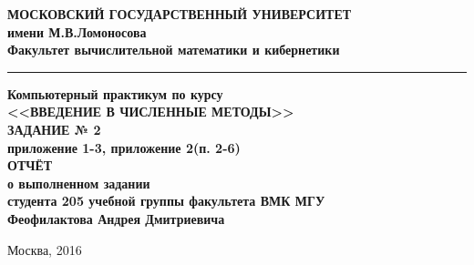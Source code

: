 \begin{titlepage}
\begin{center}

\textbf{\small 
    МОСКОВСКИЙ ГОСУДАРСТВЕННЫЙ УНИВЕРСИТЕТ \\ 
    \bigskip имени М.В.Ломоносова \\ 
    \bigskip Факультет вычислительной математики и кибернетики
}
\hrule

\vfill{}

\textbf{
    Компьютерный практикум по курсу \\ \bigskip
    <<ВВЕДЕНИЕ В ЧИСЛЕННЫЕ МЕТОДЫ>> \\ \bigskip
    ЗАДАНИЕ № 2 \\ \bigskip
    приложение 1-3, приложение 2(п. 2-6) \\ \bigskip
    ОТЧЁТ \\ \bigskip
    о выполненном задании \\ \bigskip
    студента 205 учебной группы факультета ВМК МГУ \\ \bigskip
    Феофилактова Андрея Дмитриевича
}

\vfill
Москва, 2016

\end{center}
\end{titlepage}
